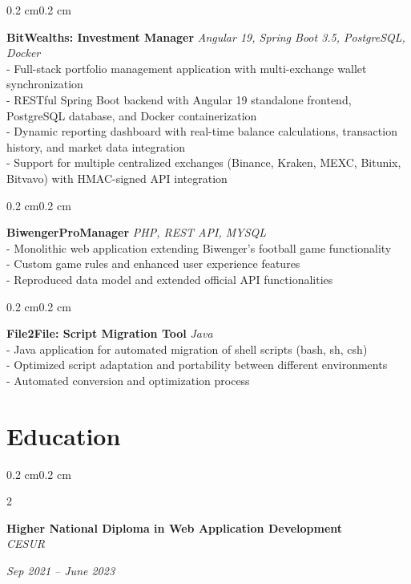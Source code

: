 \documentclass[10pt, letterpaper]{article}
\newenvironment{onecolentry}{
    \begin{adjustwidth}{0.2 cm}{0.2 cm}
}{
    \end{adjustwidth}
}
\newenvironment{twocolentry}[2][]{
    \onecolentry
    \def\secondColumn{#2}
    \setcolumnwidth{\fill, 4.5 cm}
    \begin{paracol}{2}
}{
    \switchcolumn \raggedleft \secondColumn
    \end{paracol}
    \endonecolentry
}
\let\hrefWithoutArrow\href
\renewcommand{\href}[2]{\hrefWithoutArrow{#1}{\ifthenelse{\equal{#2}{}}{ }{#2 }\raisebox{.15ex}{\footnotesize \faExternalLink*}}}
\begin{document}
    \begin{onecolentry}
        \textbf{BitWealths: Investment Manager} \hfill \textit{Angular 19, Spring Boot 3.5, PostgreSQL, Docker} \\
        - Full-stack portfolio management application with multi-exchange wallet synchronization \\
        - RESTful Spring Boot backend with Angular 19 standalone frontend, PostgreSQL database, and Docker containerization \\
        - Dynamic reporting dashboard with real-time balance calculations, transaction history, and market data integration \\
        - Support for multiple centralized exchanges (Binance, Kraken, MEXC, Bitunix, Bitvavo) with HMAC-signed API integration
    \end{onecolentry}
    
    \vspace{0.1 cm}
    
    \begin{onecolentry}
        \textbf{BiwengerProManager} \hfill \textit{PHP, REST API, MYSQL} \\
        - Monolithic web application extending Biwenger's football game functionality \\
        - Custom game rules and enhanced user experience features \\
        - Reproduced data model and extended official API functionalities
    \end{onecolentry}

    \vspace{0.1 cm}
    
    \begin{onecolentry}
        \textbf{File2File: Script Migration Tool} \hfill \textit{Java} \\
        - Java application for automated migration of shell scripts (bash, sh, csh) \\
        - Optimized script adaptation and portability between different environments \\
        - Automated conversion and optimization process
    \end{onecolentry}

    \section{Education}
    \begin{twocolentry}{\textit{Sep 2021 -- June 2023}}
        \textbf{Higher National Diploma in Web Application Development} \\
        \textit{CESUR}
    \end{twocolentry}
    
\end{document}
